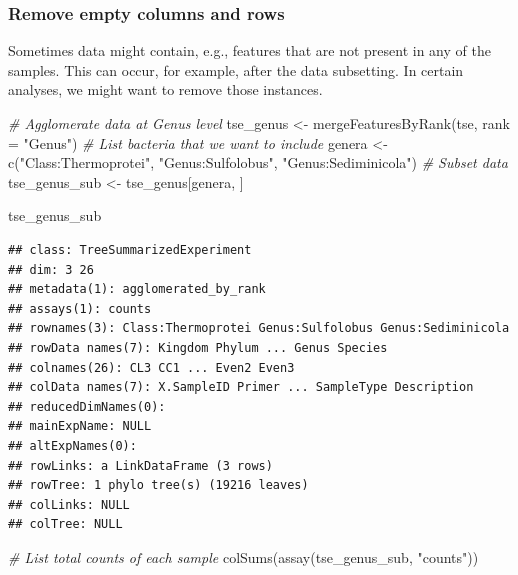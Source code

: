 \documentclass[
]{book}
\newenvironment{Shaded}{\begin{snugshade}}{\end{snugshade}}
\newcommand{\AttributeTok}[1]{\textcolor[rgb]{0.77,0.63,0.00}{#1}}
\newcommand{\CommentTok}[1]{\textcolor[rgb]{0.56,0.35,0.01}{\textit{#1}}}
\newcommand{\FunctionTok}[1]{\textcolor[rgb]{0.00,0.00,0.00}{#1}}
\newcommand{\NormalTok}[1]{#1}
\newcommand{\OtherTok}[1]{\textcolor[rgb]{0.56,0.35,0.01}{#1}}
\newcommand{\StringTok}[1]{\textcolor[rgb]{0.31,0.60,0.02}{#1}}
\begin{document}
\hypertarget{remove-empty-columns-and-rows}{%
\subsubsection{Remove empty columns and rows}\label{remove-empty-columns-and-rows}}

Sometimes data might contain, e.g., features that are not present in any of the samples.
This can occur, for example, after the data subsetting. In certain analyses, we might want to
remove those instances.

\begin{Shaded}
\begin{Highlighting}[]
\CommentTok{\# Agglomerate data at Genus level }
\NormalTok{tse\_genus }\OtherTok{\textless{}{-}} \FunctionTok{mergeFeaturesByRank}\NormalTok{(tse, }\AttributeTok{rank =} \StringTok{"Genus"}\NormalTok{)}
\CommentTok{\# List bacteria that we want to include}
\NormalTok{genera }\OtherTok{\textless{}{-}} \FunctionTok{c}\NormalTok{(}\StringTok{"Class:Thermoprotei"}\NormalTok{, }\StringTok{"Genus:Sulfolobus"}\NormalTok{, }\StringTok{"Genus:Sediminicola"}\NormalTok{)}
\CommentTok{\# Subset data}
\NormalTok{tse\_genus\_sub }\OtherTok{\textless{}{-}}\NormalTok{ tse\_genus[genera, ]}

\NormalTok{tse\_genus\_sub}
\end{Highlighting}
\end{Shaded}

\begin{verbatim}
## class: TreeSummarizedExperiment 
## dim: 3 26 
## metadata(1): agglomerated_by_rank
## assays(1): counts
## rownames(3): Class:Thermoprotei Genus:Sulfolobus Genus:Sediminicola
## rowData names(7): Kingdom Phylum ... Genus Species
## colnames(26): CL3 CC1 ... Even2 Even3
## colData names(7): X.SampleID Primer ... SampleType Description
## reducedDimNames(0):
## mainExpName: NULL
## altExpNames(0):
## rowLinks: a LinkDataFrame (3 rows)
## rowTree: 1 phylo tree(s) (19216 leaves)
## colLinks: NULL
## colTree: NULL
\end{verbatim}

\begin{Shaded}
\begin{Highlighting}[]
\CommentTok{\# List total counts of each sample}
\FunctionTok{colSums}\NormalTok{(}\FunctionTok{assay}\NormalTok{(tse\_genus\_sub, }\StringTok{"counts"}\NormalTok{))}
\end{Highlighting}
\end{Shaded}
\end{document}
